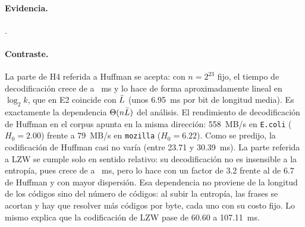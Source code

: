 \paragraph{Evidencia.} .
\paragraph{Contraste.} La parte de H4 referida a Huffman se acepta: con $n = 2^{23}$ fijo, el
tiempo de decodificación crece de \resEntropyHuffDecMsKTwo{} a
\resEntropyHuffDecMsKTwoFiftySix{}~ms y lo hace de forma aproximadamente lineal en
$\log_2 k$, que en E2 coincide con $\bar{L}$ (unos 6.95~ms por bit de longitud media). Es
exactamente la dependencia $\Theta(n\bar{L})$ del análisis. El rendimiento de decodificación de
Huffman en el corpus apunta en la misma dirección: 558~MB/s en \texttt{E.coli}
($H_0 = 2.00$) frente a 79~MB/s en \texttt{mozilla} ($H_0 = 6.22$). Como se predijo, la
codificación de Huffman casi no varía (entre 23.71 y 30.39~ms). La parte referida a LZW se
cumple solo en sentido relativo: su decodificación no es insensible a la entropía, pues crece de
\resEntropyLzwDecMsKTwo{} a \resEntropyLzwDecMsKTwoFiftySix{}~ms, pero lo hace con un factor
de 3.2 frente al de 6.7 de Huffman y con mayor dispersión. Esa dependencia no proviene de la
longitud de los códigos sino del número de códigos: al subir la entropía, las frases se acortan
y hay que resolver más códigos por byte, cada uno con su costo fijo. Lo mismo explica que la
codificación de LZW pase de 60.60 a 107.11~ms.
